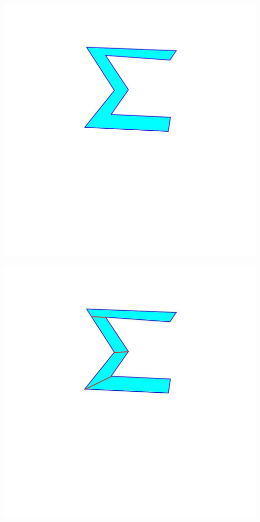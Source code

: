 \documentclass[12pt,aspectratio=169]{beamer}
\begin{document}
\begin{frame}
\begin{center}
\includegraphics[scale=0.35]{sigma}
\end{center}
\end{frame}


\begin{frame}
\begin{center}
\includegraphics[scale=0.35]{sigma2}
\end{center}
\end{frame}
\end{document}
